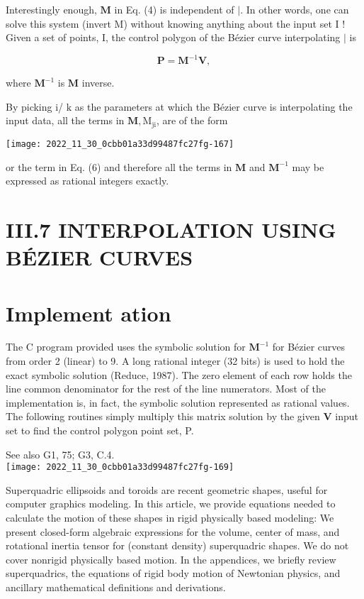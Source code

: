 Interestingly enough, $\mathbf{M}$ in Eq. (4) is independent of $\mid$. In other words, one can solve this system (invert M) without knowing anything about the input set I ! Given a set of points, I, the control polygon of the Bézier curve interpolating $\mid$ is

$$
\mathbf{P}=\mathbf{M}^{-1} \mathbf{V},
$$

where $\mathbf{M}^{-1}$ is $\mathbf{M}$ inverse.

By picking i/ $\mathrm{k}$ as the parameters at which the Bézier curve is interpolating the input data, all the terms in $\mathbf{M}, \mathrm{M}_{\mathrm{ji}}$, are of the form

\begin{center}
\texttt{[image: 2022\_11\_30\_0cbb01a33d99487fc27fg-167]}
\end{center}

or the term in Eq. (6) and therefore all the terms in $\mathbf{M}$ and $\mathbf{M}^{-1}$ may be expressed as rational integers exactly.

\section{III.7 INTERPOLATION USING BÉZIER CURVES}
\section{Implement ation}
The C program provided uses the symbolic solution for $\mathbf{M}^{-1}$ for Bézier curves from order 2 (linear) to 9. A long rational integer (32 bits) is used to hold the exact symbolic solution (Reduce, 1987). The zero element of each row holds the line common denominator for the rest of the line numerators. Most of the implementation is, in fact, the symbolic solution represented as rational values. The following routines simply multiply this matrix solution by the given $\mathbf{V}$ input set to find the control polygon point set, P.

See also G1, 75; G3, C.4.\\
\texttt{[image: 2022\_11\_30\_0cbb01a33d99487fc27fg-169]}

Superquadric ellipsoids and toroids are recent geometric shapes, useful for computer graphics modeling. In this article, we provide equations needed to calculate the motion of these shapes in rigid physically based modeling: We present closed-form algebraic expressions for the volume, center of mass, and rotational inertia tensor for (constant density) superquadric shapes. We do not cover nonrigid physically based motion. In the appendices, we briefly review superquadrics, the equations of rigid body motion of Newtonian physics, and ancillary mathematical definitions and derivations.

